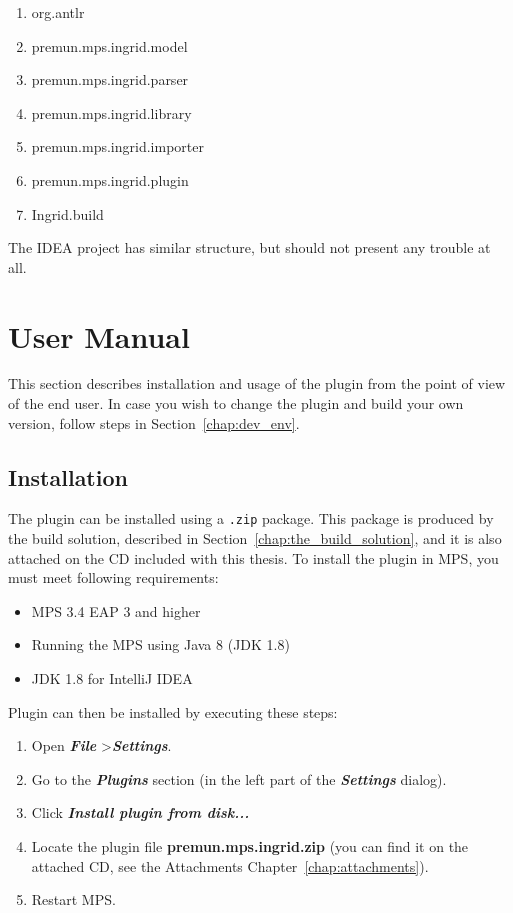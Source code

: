 \begin{enumerate}
	\item org.antlr
	\item premun.mps.ingrid.model
	\item premun.mps.ingrid.parser
	\item premun.mps.ingrid.library
	\item premun.mps.ingrid.importer
	\item premun.mps.ingrid.plugin
	\item Ingrid.build
\end{enumerate}

The IDEA project has similar structure, but should not present any trouble at all.

\section{User Manual}

This section describes installation and usage of the plugin from the point of view of the end user.
In case you wish to change the plugin and build your own version, follow steps in Section~\ref{chap:dev_env}.

\subsection{Installation}

The plugin can be installed using a \texttt{.zip} package.
This package is produced by the build solution, described in Section~\ref{chap:the_build_solution}, and it is also attached on the CD included with this thesis.
To install the plugin in MPS, you must meet following requirements:

\begin{itemize}
	\item MPS 3.4 EAP 3 and higher
	\item Running the MPS using Java 8 (JDK 1.8)
	\item JDK 1.8 for IntelliJ IDEA
\end{itemize}

\noindent
Plugin can then be installed by executing these steps:

\begin{enumerate}
	\item Open \textbf{\textit{File}} \textgreater \textbf{\textit{Settings}}.
	\item Go to the \textbf{\textit{Plugins}} section (in the left part of the \textbf{\textit{Settings}} dialog).
	\item Click \textbf{\textit{Install plugin from disk...}}
	\item Locate the plugin file \textbf{premun.mps.ingrid.zip} (you can find it on the attached CD, see the Attachments Chapter~\ref{chap:attachments}).
	\item Restart MPS.
\end{enumerate}

